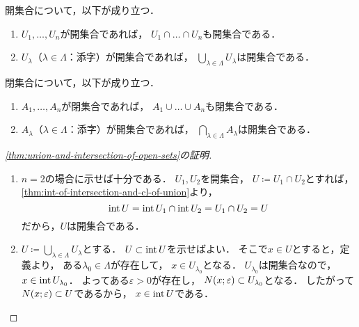 \documentclass[../sotsu.tex]{subfiles}
\begin{document}
\begin{theorem}
    \label{thm:union-and-intersection-of-open-sets}
    開集合について，以下が成り立つ．
    \begin{enumerate}
        \item $U_1, \dots, U_n$が開集合であれば，
            $U_1 \cap \dots \cap U_n$も開集合である．
        \item $U_\lambda$（$\lambda \in \Lambda$：添字）が開集合であれば，
            $\bigcup_{\lambda \in \Lambda} U_\lambda$は開集合である．
    \end{enumerate}
\end{theorem}


\begin{corollary}
    \label{thm:union-and-intersection-of-closed-sets}
    閉集合について，以下が成り立つ．
    \begin{enumerate}
    \item $A_1, \dots, A_n$が閉集合であれば，
        $A_1 \cup \dots \cup A_n$も閉集合である．
    \item $A_\lambda$（$\lambda \in \Lambda$：添字）が開集合であれば，
        $\bigcap_{\lambda \in \Lambda} A_\lambda$は開集合である．
    \end{enumerate}
\end{corollary}


\begin{proof}[\cref{thm:union-and-intersection-of-open-sets}の証明]
    \begin{enumerate}
        \item $n = 2$の場合に示せば十分である．
            $U_1, U_2$を開集合，
            $U \coloneq U_1 \cap U_2$とすれば，
            \cref{thm:int-of-intersection-and-cl-of-union}より，
            \begin{equation*}
                \operatorname{int}{U} = \operatorname{int}{U_1} \cap \operatorname{int}{U_2}
                    = U_1 \cap U_2
                    = U
            \end{equation*}
            だから，$U$は開集合である．
        \item $U \coloneq \bigcup_{\lambda \in \Lambda} U_\lambda$とする．
            $U \subset \operatorname{int}{U}$を示せばよい．
            そこで$x \in U$とすると，定義より，
            ある$\lambda_0 \in \Lambda$が存在して，
            $x \in U_{\lambda_0}$となる．
            $U_{\lambda_0}$は開集合なので，$x \in \operatorname{int}{U_{\lambda_0}}$．
            よってある$\varepsilon > 0$が存在し，
            $N(x; \varepsilon) \subset U_{\lambda_0}$となる．
            したがって$N(x; \varepsilon) \subset U$であるから，
            $x \in \operatorname{int}{U}$である．
            \qedhere
    \end{enumerate}
\end{proof}
\end{document}
